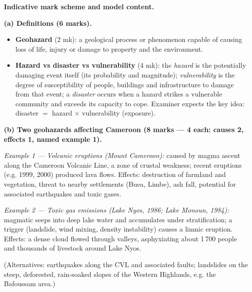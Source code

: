 \documentclass[11pt]{article}
\begin{document}
\begin{corrige}
\textbf{Indicative mark scheme and model content.}

\textbf{(a) Definitions (6 marks).}
\begin{itemize}
\item \textbf{Geohazard} (2 mk): a geological process or phenomenon capable of causing loss of life, injury or damage to property and the environment.
\item \textbf{Hazard vs disaster vs vulnerability} (4 mk): the \emph{hazard} is the potentially damaging event itself (its probability and magnitude); \emph{vulnerability} is the degree of susceptibility of people, buildings and infrastructure to damage from that event; a \emph{disaster} occurs when a hazard strikes a vulnerable community and exceeds its capacity to cope. Examiner expects the key idea: disaster $=$ hazard $\times$ vulnerability (exposure).
\end{itemize}

\textbf{(b) Two geohazards affecting Cameroon (8 marks — 4 each: causes 2, effects 1, named example 1).}

\emph{Example 1 — Volcanic eruptions (Mount Cameroon):} caused by magma ascent along the Cameroon Volcanic Line, a zone of crustal weakness; recent eruptions (e.g. 1999, 2000) produced lava flows. Effects: destruction of farmland and vegetation, threat to nearby settlements (Buea, Limbe), ash fall, potential for associated earthquakes and toxic gases.

\emph{Example 2 — Toxic gas emissions (Lake Nyos, 1986; Lake Monoun, 1984):} magmatic  seeps into deep lake water and accumulates under stratification; a trigger (landslide, wind mixing, density instability) causes a limnic eruption. Effects: a dense  cloud flowed through valleys, asphyxiating about 1\,700 people and thousands of livestock around Lake Nyos.

(Alternatives: earthquakes along the CVL and associated faults; landslides on the steep, deforested, rain-soaked slopes of the Western Highlands, e.g. the Bafoussam area.)


\end{corrige}
\end{document}
